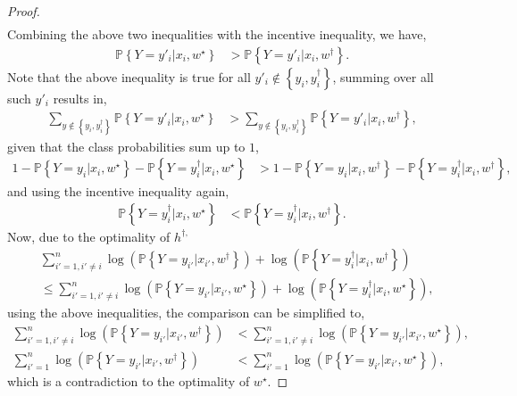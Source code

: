 \documentclass{article}
\begin{document}
\begin{proof}
\begin{align*}
\end{align*}
Combining the above two inequalities with the incentive inequality, we have,
\begin{align*}
\mathbb{P}\left\{Y = y'_{i} | x_{i}, w^\star \right\} &> \mathbb{P}\left\{Y = y'_{i} | x_{i}, w^{\dagger}\right\}.
\end{align*}
Note that the above inequality is true for all $y'_{i} \notin \left\{y_{i}, y^{\dagger}_{i}\right\}$, summing over all such $y'_{i}$ results in,
\begin{align*}
\displaystyle\sum_{y \notin \left\{y_{i}, y^{\dagger}_{i}\right\}} \mathbb{P}\left\{Y = y'_{i} | x_{i}, w^\star \right\} &> \displaystyle\sum_{y \notin \left\{y_{i}, y^{\dagger}_{i}\right\}} \mathbb{P}\left\{Y = y'_{i} | x_{i}, w^{\dagger}\right\},
\end{align*}
given that the class probabilities sum up to $1$,
\begin{align*}
1 - \mathbb{P}\left\{Y = y_{i} | x_{i}, w^\star \right\} - \mathbb{P}\left\{Y = y^{\dagger}_{i} | x_{i}, w^\star \right\} &> 1 - \mathbb{P}\left\{Y = y_{i} | x_{i}, w^{\dagger}\right\} - \mathbb{P}\left\{Y = y^{\dagger}_{i} | x_{i}, w^{\dagger}\right\},
\end{align*}
and using the incentive inequality again,
\begin{align*}
\mathbb{P}\left\{Y = y^{\dagger}_{i} | x_{i}, w^\star \right\} &< \mathbb{P}\left\{Y = y^{\dagger}_{i} | x_{i}, w^{\dagger}\right\}.
\end{align*}
Now, due to the optimality of $h^{\dagger,}$
\begin{align*}
&  \displaystyle\sum_{i'=1, i' \neq  i}^{n} \log\left(\mathbb{P}\left\{Y = y_{i'} | x_{i'}, w^{\dagger}\right\}\right) + \log\left(\mathbb{P}\left\{Y = y^{\dagger}_{i} | x_{i}, w^{\dagger}\right\}\right)
\\ &\leq  \displaystyle\sum_{i'=1, i' \neq  i}^{n} \log\left(\mathbb{P}\left\{Y = y_{i'} | x_{i'}, w^\star \right\}\right) + \log\left(\mathbb{P}\left\{Y = y^{\dagger}_{i} | x_{i}, w^\star \right\}\right),
\end{align*}
using the above inequalities, the comparison can be simplified to,
\begin{align*}
\displaystyle\sum_{i'=1, i' \neq  i}^{n} \log\left(\mathbb{P}\left\{Y = y_{i'} | x_{i'}, w^{\dagger}\right\}\right) &< \displaystyle\sum_{i'=1, i' \neq  i}^{n} \log\left(\mathbb{P}\left\{Y = y_{i'} | x_{i'}, w^\star \right\}\right),
\\ \displaystyle\sum_{i'=1}^{n} \log\left(\mathbb{P}\left\{Y = y_{i'} | x_{i'}, w^{\dagger}\right\}\right) &< \displaystyle\sum_{i'=1}^{n} \log\left(\mathbb{P}\left\{Y = y_{i'} | x_{i'}, w^\star \right\}\right),
\end{align*}
which is a contradiction to the optimality of $w^\star $.
\newline \newline\end{proof}
\end{document}
